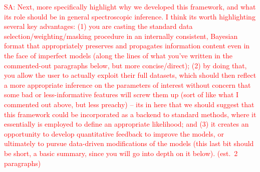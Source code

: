 \documentclass[iop,floatfix]{emulateapj}
\newcommand{\comm}[1]{ \textcolor{red}{SA: #1}}
\begin{document}
\comm{Next, more specifically highlight why we developed this framework, and what its 
role should be in general spectroscopic inference.  I think its worth highlighting several key 
advantages: (1) you are casting the standard data selection/weighting/masking procedure in an 
internally consistent, Bayesian format that appropriately preserves and propagates information 
content even in the face of imperfect models (along the lines of what you've written in the 
commented-out paragraphs below, but more concise/direct); (2) by doing that, you allow the user to 
actually exploit their full datasets, which should then reflect a more appropriate inference on the 
parameters of interest without concern that some bad or less-informative features will screw them 
up (sort of like what I commented out above, but less preachy) -- its in here 
that we should suggest that this framework could be incorporated as a backend to standard methods, 
where it essentially is employed to define an appropriate likelihood; and (3) it creates an 
opportunity to develop quantitative feedback to improve the models, or ultimately to 
pursue data-driven modifications of the models (this last bit should be short, a basic summary, 
since you will go into depth on it below). (est.~2 paragraphs)} \\

%
\end{document}
